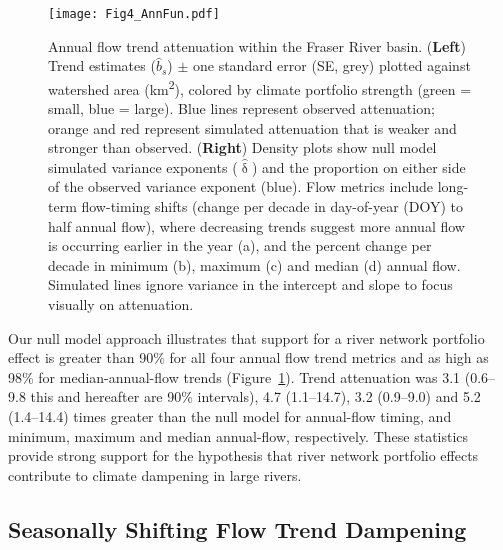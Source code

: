 \documentclass{AGUJournal}
\begin{document}
\begin{figure}[h]
\centering
\texttt{[image: Fig4\_AnnFun.pdf]}
	\caption{Annual flow trend attenuation within the Fraser River basin. (\textbf{Left}) Trend estimates ($\hat{b}_{s}$) $\pm$ one standard error (SE, grey) plotted against watershed area (km\textsuperscript{2}), colored by climate portfolio strength (green = small, blue = large). Blue lines represent observed attenuation; orange and red represent simulated attenuation that is weaker and stronger than observed. (\textbf{Right}) Density plots show null model simulated variance exponents ($\hat{\updelta}$) and the proportion on either side of the observed variance exponent (blue). Flow metrics include long-term flow-timing shifts (change per decade in day-of-year (DOY) to half annual flow), where decreasing trends suggest more annual flow is occurring earlier in the year (a), and the percent change per decade in minimum (b), maximum (c) and median (d) annual flow. Simulated lines ignore variance in the intercept and slope to focus visually on attenuation.}
\label{fig:3}
\end{figure}

Our null model approach illustrates that support for a river network portfolio effect is greater than 90\% for all four annual flow trend metrics and as high as 98\% for median-annual-flow trends (Figure~\ref{fig:3}). Trend attenuation was 3.1 (0.6--9.8 this and hereafter are 90\% intervals), 4.7 (1.1--14.7), 3.2 (0.9--9.0) and 5.2 (1.4--14.4) times greater than the null model for annual-flow timing, and minimum, maximum and median annual-flow, respectively. These statistics provide strong support for the hypothesis that river network portfolio effects contribute to climate dampening in large rivers.

\subsection{Seasonally Shifting Flow Trend Dampening}
\end{document}
